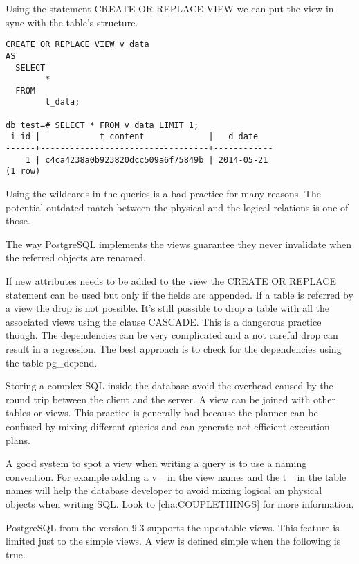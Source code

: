 Using the statement CREATE OR REPLACE VIEW we can put the view in sync with the table's structure.

\begin{lstlisting}[style=pgsql]
 CREATE OR REPLACE VIEW v_data
AS
  SELECT
        *
  FROM
        t_data;

db_test=# SELECT * FROM v_data LIMIT 1;
 i_id |            t_content             |   d_date
------+----------------------------------+------------
    1 | c4ca4238a0b923820dcc509a6f75849b | 2014-05-21
(1 row)

\end{lstlisting}

Using the wildcards in the queries is a bad practice for many reasons. The potential outdated
match between the physical and the logical relations is one of those.\newline

The way PostgreSQL implements the views guarantee they never invalidate when the referred objects are
renamed. \newline

If new attributes needs to be added to the view the CREATE OR REPLACE statement can be used but only if
the fields are appended. If a table is referred by a view the drop is not possible. It's still possible
to drop a table with all the associated views using the clause CASCADE. This is a dangerous
practice though. The dependencies can be very complicated and a not careful drop can result in a
regression. The best approach is to check for the dependencies using the table pg\_depend.\newline

Storing a complex SQL inside the database avoid the overhead caused by the round trip between the client
and the server. A view can be joined with other tables or views. This practice is generally bad because
the planner can be confused by mixing different queries and can generate not efficient execution
plans.\newline

A good system to spot a view when writing a query is to use a naming convention. For example adding a v\_
in the view names and the t\_ in the table names will help the database developer to avoid
mixing logical an physical objects when writing SQL. Look to \ref{cha:COUPLETHINGS} for more information.

PostgreSQL from the version 9.3 supports the updatable views. This feature is limited just to the
simple views. A view is defined simple when the following is true.

